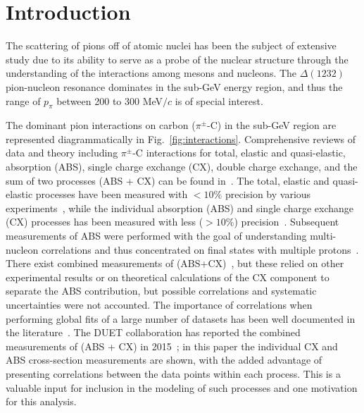\section{\label{sec:intro}Introduction\protect}
The scattering of pions off of atomic nuclei has been the subject of extensive study
due to its ability to serve as a probe of the nuclear structure 
through the understanding of the interactions among mesons and nucleons. The $\Delta(1232)$ pion-nucleon resonance dominates in the sub-GeV energy region, and thus the range of $p_{\pi}$ between 200 to 300 MeV$/c$ is of special interest.


The dominant pion interactions on carbon ($\pi^{\pm}$-C) in the sub-GeV region are represented diagrammatically in Fig.~\ref{fig:interactions}. Comprehensive reviews of data and theory including $\pi^{\pm}$-C interactions for total, elastic and quasi-elastic, absorption (ABS), single charge exchange (CX), double charge exchange, and the sum of two processes (ABS + CX) can be found in~\cite{review1,review2}. The total, elastic and quasi-elastic processes have been measured with $<10\%$ precision by various experiments~\cite{Allardyce,Binon,Gelderloos,Meirav,Moinester,Levenson,Ashery,Saunders1996,Jones1993}, while the individual absorption (ABS) and single charge exchange (CX) processes has been measured with less ($>10\%$) precision~\cite{Jones1993,Ashery2,Hilscher,Bowles,Bellotti1973,Bellotti1973_2}. Subsequent measurements of ABS were performed with the goal of understanding multi-nucleon correlations and thus concentrated on final states with multiple protons~\cite{Ransome1992,Jones1993,Gianelli2000}. There exist combined measurements of (ABS+CX)~\cite{Saunders1996,Ashery,Miller,navon,navon2}, but these relied on other experimental results or on theoretical calculations of the CX component to separate the ABS contribution, but possible correlations and systematic uncertainties were not accounted. The importance of correlations when performing global fits of a large number of datasets has been well documented in the literature~\cite{Pumplin,Stump,niwgPaper}. The DUET collaboration has reported the combined measurements of (ABS + CX) in 2015~\cite{duet}; in this paper the individual CX and ABS cross-section measurements are shown, with the added advantage of presenting correlations between the data points within each process. This is a valuable input for inclusion in the modeling of such processes and one motivation for this analysis.


